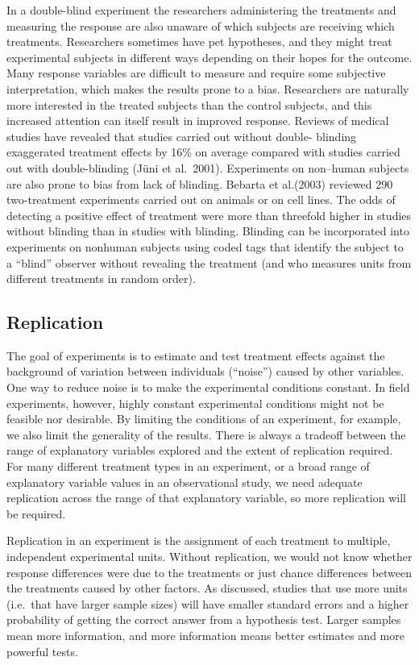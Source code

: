 \documentclass[]{book}
\begin{document}
In a double-blind experiment the researchers administering the treatments and measuring the response are also unaware of which subjects are receiving which treatments. Researchers sometimes have pet hypotheses, and they might treat experimental subjects in different ways depending on their hopes for the outcome. Many response variables are difficult to measure and require some subjective interpretation, which makes the results prone to a bias. Researchers are naturally more interested in the treated subjects than the control subjects, and this increased attention can itself result in improved response. Reviews of medical studies have revealed that studies carried out without double- blinding exaggerated treatment effects by 16\% on average compared with studies carried out with double-blinding (Jüni et al.~2001). Experiments on non--human subjects are also prone to bias from lack of blinding. Bebarta et al.(2003) reviewed 290 two-treatment experiments carried out on animals or on cell lines. The odds of detecting a positive effect of treatment were more than threefold higher in studies without blinding than in studies with blinding. Blinding can be incorporated into experiments on nonhuman subjects using coded tags that identify the subject to a ``blind'' observer without revealing the treatment (and who measures units from different treatments in random order).

\hypertarget{replication}{%
\subsection{Replication}\label{replication}}

The goal of experiments is to estimate and test treatment effects against the background of variation between individuals (``noise'') caused by other variables. One way to reduce noise is to make the experimental conditions constant. In field experiments, however, highly constant experimental conditions might not be feasible nor desirable. By limiting the conditions of an experiment, for example, we also limit the generality of the results. There is always a tradeoff between the range of explanatory variables explored and the extent of replication required. For many different treatment types in an experiment, or a broad range of explanatory variable values in an observational study, we need adequate replication across the range of that explanatory variable, so more replication will be required.

Replication in an experiment is the assignment of each treatment to multiple, independent experimental units. Without replication, we would not know whether response differences were due to the treatments or just chance differences between the treatments caused by other factors. As discussed, studies that use more units (i.e.~that have larger sample sizes) will have smaller standard errors and a higher probability of getting the correct answer from a hypothesis test. Larger samples mean more information, and more information means better estimates and more powerful tests.
\end{document}
